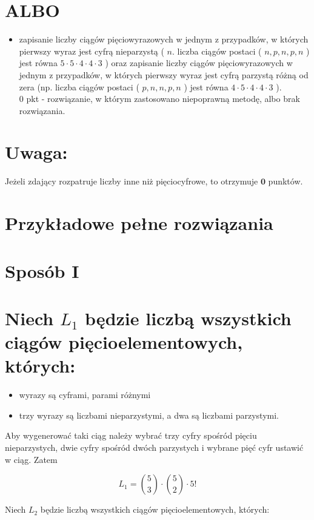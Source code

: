 \documentclass[10pt]{article}
\begin{document}
\section*{ALBO}
\begin{itemize}
  \item zapisanie liczby ciągów pięciowyrazowych w jednym z przypadków, w których pierwszy wyraz jest cyfrą nieparzystą ( $n$. liczba ciągów postaci ( $n, p, n, p, n$ ) jest równa $5 \cdot 5 \cdot 4 \cdot 4 \cdot 3$ ) oraz zapisanie liczby ciągów pięciowyrazowych w jednym z przypadków, w których pierwszy wyraz jest cyfrą parzystą różną od zera (np. liczba ciągów postaci ( $p, n, n, p, n$ ) jest równa $4 \cdot 5 \cdot 4 \cdot 4 \cdot 3$ ).\\
0 pkt - rozwiązanie, w którym zastosowano niepoprawną metodę, albo brak rozwiązania.
\end{itemize}

\section*{Uwaga:}
Jeżeli zdający rozpatruje liczby inne niż pięciocyfrowe, to otrzymuje $\mathbf{0}$ punktów.

\section*{Przykładowe pełne rozwiązania}
\section*{Sposób I}
\section*{Niech $L_{1}$ będzie liczbą wszystkich ciągów pięcioelementowych, których:}
\begin{itemize}
  \item wyrazy są cyframi, parami różnymi
  \item trzy wyrazy są liczbami nieparzystymi, a dwa są liczbami parzystymi.
\end{itemize}

Aby wygenerować taki ciąg należy wybrać trzy cyfry spośród pięciu nieparzystych, dwie cyfry spośród dwóch parzystych i wybrane pięć cyfr ustawić w ciąg. Zatem

$$
L_{1}=\binom{5}{3} \cdot\binom{5}{2} \cdot 5!
$$

Niech $L_{2}$ będzie liczbą wszystkich ciągów pięcioelementowych, których:
\end{document}
